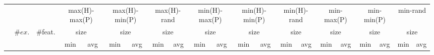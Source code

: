 \begin{tabular}{lccrrrrrrrrrrrrrrrrrr}
\toprule
& && \multicolumn{2}{c}{max(H)-max(P)} & \multicolumn{2}{c}{max(H)-min(P)} & \multicolumn{2}{c}{max(H)-rand} & \multicolumn{2}{c}{min(H)-max(P)} & \multicolumn{2}{c}{min(H)-min(P)} & \multicolumn{2}{c}{min(H)-rand} & \multicolumn{2}{c}{min-max(P)} & \multicolumn{2}{c}{min-min(P)} & \multicolumn{2}{c}{min-rand}\\
\cmidrule(rr){4-5}\cmidrule(rr){6-7}\cmidrule(rr){8-9}\cmidrule(rr){10-11}\cmidrule(rr){12-13}\cmidrule(rr){14-15}\cmidrule(rr){16-17}\cmidrule(rr){18-19}\cmidrule(rr){20-21}
&\multirow{2}{*}{$\#ex.$} & \multirow{2}{*}{\#feat.} &  \multicolumn{2}{c}{size} & \multicolumn{2}{c}{size} & \multicolumn{2}{c}{size} & \multicolumn{2}{c}{size} & \multicolumn{2}{c}{size} & \multicolumn{2}{c}{size} & \multicolumn{2}{c}{size} & \multicolumn{2}{c}{size} & \multicolumn{2}{c}{size} \\\cmidrule(rl){4-5}\cmidrule(rl){6-7}\cmidrule(rl){8-9}\cmidrule(rl){10-11}\cmidrule(rl){12-13}\cmidrule(rl){14-15}\cmidrule(rl){16-17}\cmidrule(rl){18-19}\cmidrule(rl){20-21}
&& & \multicolumn{1}{c}{min} & \multicolumn{1}{c}{avg} & \multicolumn{1}{c}{min} & \multicolumn{1}{c}{avg} & \multicolumn{1}{c}{min} & \multicolumn{1}{c}{avg} & \multicolumn{1}{c}{min} & \multicolumn{1}{c}{avg} & \multicolumn{1}{c}{min} & \multicolumn{1}{c}{avg} & \multicolumn{1}{c}{min} & \multicolumn{1}{c}{avg} & \multicolumn{1}{c}{min} & \multicolumn{1}{c}{avg} & \multicolumn{1}{c}{min} & \multicolumn{1}{c}{avg} & \multicolumn{1}{c}{min} & \multicolumn{1}{c}{avg} \\
\midrule


\end{tabular}
